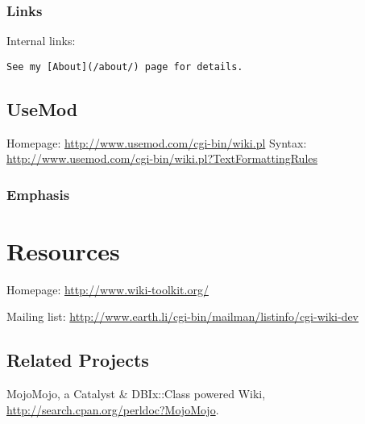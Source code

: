 \subsubsection{Links}
Internal links:

\begin{verbatim}
See my [About](/about/) page for details.
\end{verbatim}

\subsection{UseMod}
Homepage: \url{http://www.usemod.com/cgi-bin/wiki.pl}
Syntax: \url{http://www.usemod.com/cgi-bin/wiki.pl?TextFormattingRules}

\subsubsection{Emphasis}

\section{Resources}

Homepage: \url{http://www.wiki-toolkit.org/}

Mailing list: \url{http://www.earth.li/cgi-bin/mailman/listinfo/cgi-wiki-dev}

\subsection{Related Projects}
MojoMojo, a Catalyst \& DBIx::Class powered Wiki,
\url{http://search.cpan.org/perldoc?MojoMojo}.


    
